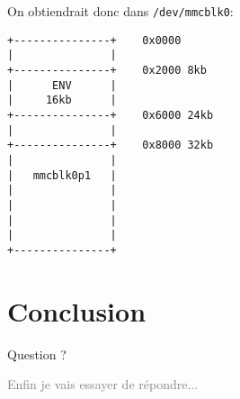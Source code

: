 \documentclass[compress]{beamer}
\begin{document}
\begin{frame}[fragile]
On obtiendrait donc dans \texttt{/dev/mmcblk0}:
\begin{lstlisting}[style=shell]
+---------------+    0x0000
|               |
+---------------+    0x2000 8kb
|      ENV      |
|     16kb      |
+---------------+    0x6000 24kb
|               |
+---------------+    0x8000 32kb
|               |
|   mmcblk0p1   |
|               |
|               |
|               |
|               |
+---------------+
\end{lstlisting}
\end{frame}



\section*{Conclusion}
\begin{frame}
\begin{center}
\begin{huge}
Question ?
\end{huge}
\end{center}
\begin{center}
\textcolor{gray}{\tiny{Enfin je vais essayer de répondre...}}
\end{center}
\end{frame}
\end{document}
